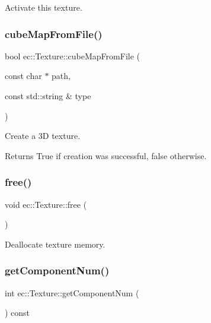 Activate this texture. 

\mbox{\label{classec_1_1_texture_ae84b0f18fa11275f09e4c8ea3dc89e02}} 
\subsubsection{\texorpdfstring{cube\+Map\+From\+File()}{cubeMapFromFile()}}
{\footnotesize\ttfamily bool ec\+::\+Texture\+::cube\+Map\+From\+File (\begin{DoxyParamCaption}\item[{const char $\ast$}]{path,  }\item[{const std\+::string \&}]{type }\end{DoxyParamCaption})}



Create a 3D texture. 

\begin{DoxyReturn}{Returns}
True if creation was successful, false otherwise. 
\end{DoxyReturn}
\mbox{\label{classec_1_1_texture_a57242daae8cc1ea827848f9b7f7b7fbb}} 
\subsubsection{\texorpdfstring{free()}{free()}}
{\footnotesize\ttfamily void ec\+::\+Texture\+::free (\begin{DoxyParamCaption}{ }\end{DoxyParamCaption})}



Deallocate texture memory. 

\mbox{\label{classec_1_1_texture_a941dc88bd9843fcf8273dc8d8a259c03}} 
\subsubsection{\texorpdfstring{get\+Component\+Num()}{getComponentNum()}}
{\footnotesize\ttfamily int ec\+::\+Texture\+::get\+Component\+Num (\begin{DoxyParamCaption}{ }\end{DoxyParamCaption}) const}



